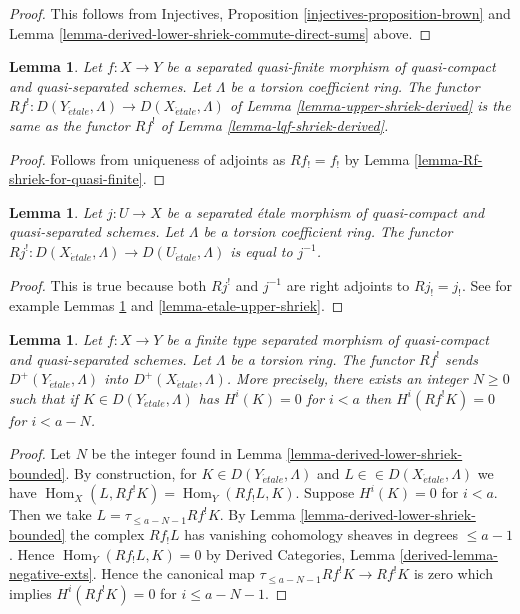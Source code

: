 \documentclass{stacks-project}
\theoremstyle{plain}
\newtheorem{lemma}[subsection]{Lemma}
\theoremstyle{definition}
\theoremstyle{remark}
\numberwithin{equation}{subsection}
\def\Hom{\mathop{\mathrm{Hom}}\nolimits}
\def\etale{{\acute{e}tale}}
\begin{document}
\begin{proof}
This follows from
Injectives, Proposition \ref{injectives-proposition-brown}
and Lemma \ref{lemma-derived-lower-shriek-commute-direct-sums} above.
\end{proof}

\begin{lemma}
\label{lemma-Rf-upper-shriek-for-quasi-finite}
Let $f : X \to Y$ be a separated quasi-finite morphism of quasi-compact
and quasi-separated schemes. Let $\Lambda$ be a torsion coefficient ring.
The functor $Rf^! : D(Y_\etale, \Lambda) \to D(X_\etale, \Lambda)$
of Lemma \ref{lemma-upper-shriek-derived} is the same as the functor
$Rf^!$ of Lemma \ref{lemma-lqf-shriek-derived}.
\end{lemma}

\begin{proof}
Follows from uniqueness of adjoints as $Rf_! = f_!$ by
Lemma \ref{lemma-Rf-shriek-for-quasi-finite}.
\end{proof}

\begin{lemma}
\label{lemma-Rf-upper-shriek-for-etale}
Let $j : U \to X$ be a separated \'etale morphism of quasi-compact
and quasi-separated schemes. Let $\Lambda$ be a torsion coefficient ring.
The functor $Rj^! : D(X_\etale, \Lambda) \to D(U_\etale, \Lambda)$
is equal to $j^{-1}$.
\end{lemma}

\begin{proof}
This is true because both $Rj^!$ and $j^{-1}$ are right adjoints to
$Rj_! = j_!$. See for example Lemmas
\ref{lemma-Rf-upper-shriek-for-quasi-finite} and
\ref{lemma-etale-upper-shriek}.
\end{proof}

\begin{lemma}
\label{lemma-twisted-inverse-image-bounded-below}
Let $f : X \to Y$ be a finite type separated morphism of
quasi-compact and quasi-separated schemes. Let $\Lambda$ be a torsion
ring. The functor $Rf^!$ sends $D^+(Y_\etale, \Lambda)$ into
$D^+(X_\etale, \Lambda)$. More precisely, there exists an integer
$N \geq 0$ such that if $K \in D(Y_\etale, \Lambda)$ has $H^i(K) = 0$
for $i < a$ then $H^i(Rf^!K) = 0$ for $i < a - N$.
\end{lemma}

\begin{proof}
Let $N$ be the integer found in Lemma \ref{lemma-derived-lower-shriek-bounded}.
By construction, for $K \in D(Y_\etale, \Lambda)$ and
$L \in \in D(X_\etale, \Lambda)$ we have
$\Hom_X(L, Rf^!K) = \Hom_Y(Rf_!L, K)$. Suppose $H^i(K) = 0$
for $i < a$. Then we take $L = \tau_{\leq a - N - 1}Rf^!K$. By
Lemma \ref{lemma-derived-lower-shriek-bounded}
the complex $Rf_!L$ has vanishing cohomology sheaves in
degrees $\leq a - 1$. Hence $\Hom_Y(Rf_!L, K) = 0$ by
Derived Categories, Lemma \ref{derived-lemma-negative-exts}.
Hence the canonical map $\tau_{\leq a - N - 1}Rf^!K \to Rf^!K$
is zero which implies $H^i(Rf^!K) = 0$ for $i \leq a - N - 1$.
\end{proof}
\end{document}
